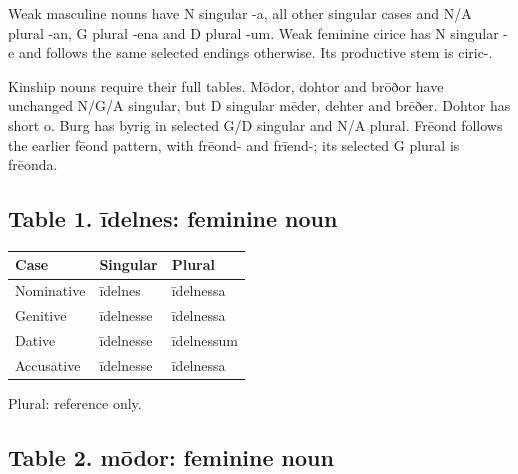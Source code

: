 Weak masculine nouns have N singular -a, all other singular cases and N/\allowbreak{}A plural -an, G plural -ena and D plural -um. Weak feminine cirice has N singular -e and follows the same selected endings otherwise. Its productive stem is ciric-.

Kinship nouns require their full tables. Mōdor, dohtor and brōðor have unchanged N/\allowbreak{}G/\allowbreak{}A singular, but D singular mēder, dehter and brēðer. Dohtor has short o. Burg has byrig in selected G/\allowbreak{}D singular and N/\allowbreak{}A plural. Frēond follows the earlier fēond pattern, with frēond- and frīend-; its selected G plural is frēonda.

\subsection*{Table 1. īdelnes: feminine noun}

\par\begingroup
\fontsize{10.5}{13.2}\selectfont
\setlength{\LTleft}{0pt}\setlength{\LTright}{\fill}
\noindent
\begin{tabular}{@{}>{\raggedright\arraybackslash}p{39.46mm}>{\raggedright\arraybackslash}p{39.46mm}>{\raggedright\arraybackslash}p{39.46mm}@{}}
\toprule
\textbf{Case} & \textbf{Singular} & \textbf{Plural} \\
\midrule
Nominative & īdelnes & īdelnessa \\
Genitive & īdelnesse & īdelnessa \\
Dative & īdelnesse & īdelnessum \\
Accusative & īdelnesse & īdelnessa \\
\bottomrule
\end{tabular}
\par\endgroup

Plural: reference only.

\subsection*{Table 2. mōdor: feminine noun}

